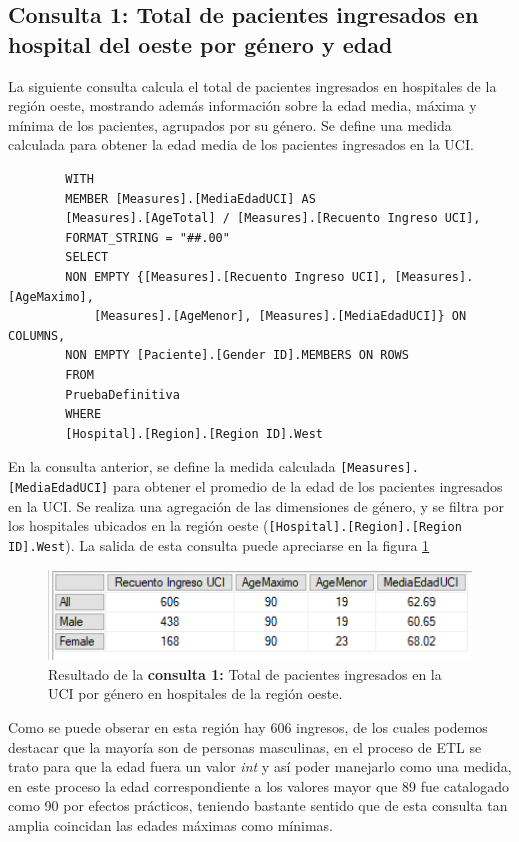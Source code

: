 \documentclass[12pt, a4paper, twoside]{article}
\begin{document}
	\subsection{Consulta 1: Total de pacientes ingresados en hospital del oeste por género y edad}
	La siguiente consulta calcula el total de pacientes ingresados en hospitales de la región oeste, mostrando además información sobre la edad media, máxima y mínima de los pacientes, agrupados por su género. Se define una medida calculada para obtener la edad media de los pacientes ingresados en la UCI.
	
	\begin{verbatim}
		WITH 
		MEMBER [Measures].[MediaEdadUCI] AS
		[Measures].[AgeTotal] / [Measures].[Recuento Ingreso UCI],
		FORMAT_STRING = "##.00"
		SELECT 
		NON EMPTY {[Measures].[Recuento Ingreso UCI], [Measures].[AgeMaximo],
			[Measures].[AgeMenor], [Measures].[MediaEdadUCI]} ON COLUMNS, 
		NON EMPTY [Paciente].[Gender ID].MEMBERS ON ROWS
		FROM 
		PruebaDefinitiva
		WHERE 
		[Hospital].[Region].[Region ID].West
	\end{verbatim}
	En la consulta anterior, se define la medida calculada \texttt{[Measures].[MediaEdadUCI]} para obtener el promedio de la edad de los pacientes ingresados en la UCI. Se realiza una agregación de las dimensiones de género, y se filtra por los hospitales ubicados en la región oeste (\texttt{[Hospital].[Region].[Region ID].West}). La salida de esta consulta puede apreciarse en la figura \ref{fig:consulta1}
	\begin{figure}[H]
		\centering
		\includegraphics[width=1\textwidth]{image/consulta1.png}
		\caption{Resultado de la  \textbf{consulta 1:}  Total de pacientes ingresados en la UCI por género en hospitales de la región oeste.}
		\label{fig:consulta1}
	\end{figure}
	
	Como se puede obserar en esta región hay 606 ingresos, de los cuales podemos destacar que la mayoría son de personas masculinas, en el proceso de ETL se trato para que la edad fuera un valor \textit{int} y así poder manejarlo como una medida, en este proceso la edad correspondiente a los valores mayor que 89 fue catalogado como 90 por efectos prácticos, teniendo bastante sentido que de esta consulta tan amplia coincidan las edades máximas como mínimas. 
	
\end{document}

